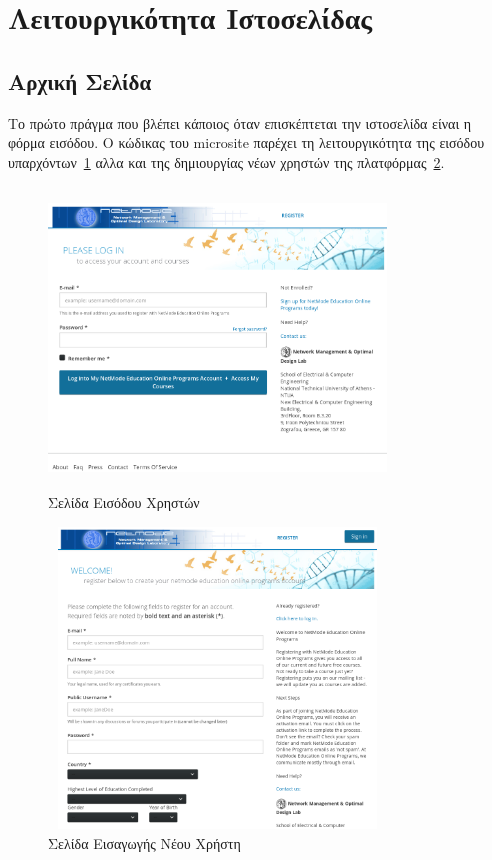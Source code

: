 \documentclass[12pt]{report}
\begin{document}
\section{Λειτουργικότητα Ιστοσελίδας}
\subsection{Αρχική Σελίδα}
Το πρώτο πράγμα που βλέπει κάποιος όταν επισκέπτεται την ιστοσελίδα είναι η φόρμα εισόδου. Ο κώδικας του \textlatin{microsite} παρέχει τη λειτουργικότητα της εισόδου υπαρχόντων~\ref{fig:microsite_login} αλλα και της δημιουργίας νέων χρηστών της πλατφόρμας~\ref{fig:microsite_register}.

\begin{figure}[h]
\centering
\includegraphics[width=0.8\textwidth, height=8cm]{microsite-login}
\caption{Σελίδα Εισόδου Χρηστών}
\label{fig:microsite_login}
\end{figure}

\begin{figure}[h]
\centering
\includegraphics[width=0.8\textwidth, height=8cm]{microsite-register}
\caption{Σελίδα Εισαγωγής Νέου Χρήστη}
\label{fig:microsite_register}
\end{figure}
\end{document}
